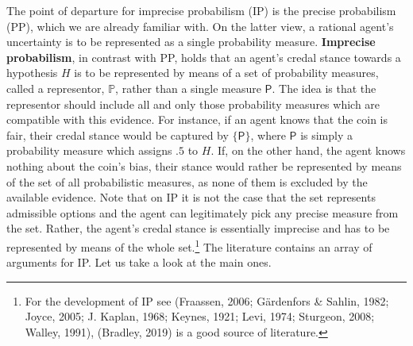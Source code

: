 \documentclass[
  10pt,
  dvipsnames,enabledeprecatedfontcommands]{scrartcl}
\begin{document}
The point of departure for imprecise probabilism (\textsf{IP}) is the
precise probabilism (\textsf{PP}), which we are already familiar with.
On the latter view, a rational agent's uncertainty is to be represented
as a single probability measure. \textbf{Imprecise probabilism}, in
contrast with PP, holds that an agent's credal stance towards a
hypothesis \(H\) is to be represented by means of a set of probability
measures, called a representor, \(\mathbb{P}\), rather than a single
measure \(\mathsf{P}\). The idea is that the representor should include
all and only those probability measures which are compatible with this
evidence. For instance, if an agent knows that the coin is fair, their
credal stance would be captured by \(\{\mathsf{P}\}\), where
\(\mathsf{P}\) is simply a probability measure which assigns \(.5\) to
\(H\). If, on the other hand, the agent knows nothing about the coin's
bias, their stance would rather be represented by means of the set of
all probabilistic measures, as none of them is excluded by the available
evidence. Note that on IP it is not the case that the set represents
admissible options and the agent can legitimately pick any precise
measure from the set. Rather, the agent's credal stance is essentially
imprecise and has to be represented by means of the whole
set.\footnote{For the development of IP see (Fraassen, 2006; Gärdenfors
  \& Sahlin, 1982; Joyce, 2005; J. Kaplan, 1968; Keynes, 1921; Levi,
  1974; Sturgeon, 2008; Walley, 1991), (Bradley, 2019) is a good source
  of literature.} The literature contains an array of arguments for IP.
Let us take a look at the main ones.
\end{document}
